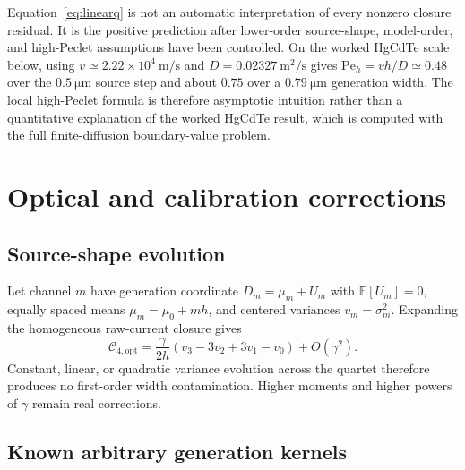 \documentclass[11pt]{article}
\newcommand{\E}{\mathbb{E}}
\begin{document}
Equation~\eqref{eq:linearq} is not an automatic interpretation of every nonzero closure residual. It is the positive prediction after lower-order source-shape, model-order, and high-Peclet assumptions have been controlled. On the worked HgCdTe scale below, using $v\simeq2.22\times10^4~\mathrm{m/s}$ and $D=0.02327~\mathrm{m^2/s}$ gives $\mathrm{Pe}_h=vh/D\simeq0.48$ over the $0.5~\si{\micro\meter}$ source step and about $0.75$ over a $0.79~\si{\micro\meter}$ generation width. The local high-Peclet formula is therefore asymptotic intuition rather than a quantitative explanation of the worked HgCdTe result, which is computed with the full finite-diffusion boundary-value problem.

\section{Optical and calibration corrections}

\subsection{Source-shape evolution}

Let channel $m$ have generation coordinate $D_m=\mu_m+U_m$ with $\E[U_m]=0$, equally spaced means $\mu_m=\mu_0+mh$, and centered variances $v_m=\sigma_m^2$. Expanding the homogeneous raw-current closure gives
\begin{equation}
\boxed{
\mathcal{C}_{4,\mathrm{opt}}
=\frac{\gamma}{2h}(v_3-3v_2+3v_1-v_0)+O(\gamma^2).}
\label{eq:opticalerror}
\end{equation}
Constant, linear, or quadratic variance evolution across the quartet therefore produces no first-order width contamination. Higher moments and higher powers of $\gamma$ remain real corrections.

\subsection{Known arbitrary generation kernels}
\end{document}
